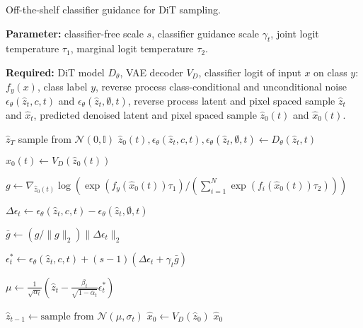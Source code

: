 \documentclass{article}
\theoremstyle{definition}
\begin{document}
\begin{algorithm}
\caption{Off-the-shelf classifier guidance for DiT sampling.}\label{alg:dit_guidance}
\begin{algorithmic}
\State \textbf{Parameter:} classifier-free scale $s$, classifier guidance scale $\gamma_t$, joint logit temperature $\tau_1$, marginal logit temperature $\tau_2$. 

\State \textbf{Required:} DiT model $D_\theta$, VAE decoder $V_D$, classifier logit of input $x$ on class $y$: $f_y(x)$, class label $y$, reverse process class-conditional and unconditional noise $\epsilon_{\theta}(\hat{z}_t,c,t) $ and $\epsilon_{\theta}(\hat{z}_t,\emptyset,t)$, reverse process latent and pixel spaced sample $\hat{z}_t$ and $\hat{x}_t$, predicted denoised latent and pixel spaced sample $\hat{z}_0(t)$ and $\hat{x}_0(t)$. 

\State $\hat{z}_T$ sample from $\mathcal{N}(0,\mathbb{I})$ 
\State $\hat{z}_0(t), \epsilon_{\theta}(\hat{z}_t,c,t), \epsilon_{\theta}(\hat{z}_t,\emptyset,t) \gets D_\theta(\hat{z}_t,t) $

\State $\hat{x}_0(t) \gets V_D(\hat{z}_0(t)) $ 

\State $ g \gets  \nabla_{\hat{z}_0(t)}\log( \exp(f_y(\hat{x}_0(t))\tau_1) / (\sum^N_{i=1} \exp(f_i(\hat{x}_0(t))\tau_2)) ) $ 

\State $ \Delta \epsilon_t \gets \epsilon_{\theta}(\hat{z}_t,c,t) - \epsilon_{\theta}(\hat{z}_t,\emptyset,t) $

\State $ \bar{g} \gets (g / \lVert g \rVert_2)  \lVert \Delta \epsilon_t \rVert_2 $ 

\State $ \epsilon_t^* \gets \epsilon_{\theta}(\hat{z}_t,c,t) + (s-1) (\Delta \epsilon_t + \gamma_t \bar{g}) $ 

\State $\mu \gets \frac{1}{\sqrt{\alpha_t}} (\hat{z}_t - 
\frac{\beta_t}{\sqrt{1-\bar{\alpha}_t}} \epsilon_t^*) $ 

\State $\hat{z}_{t-1} \gets \text{sample from } \mathcal{N}(\mu, \sigma_t) $
\EndFor 
\State $\hat{x}_0 \gets V_D(\hat{z}_0)$
\State \Return $\hat{x}_0$
\end{algorithmic}
\end{algorithm}
\end{document}
